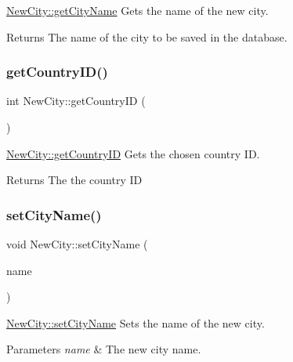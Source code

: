 \hyperlink{class_new_city_a3be62538974fa100134d694546608877}{New\+City\+::get\+City\+Name} Gets the name of the new city. 

\begin{DoxyReturn}{Returns}
The name of the city to be saved in the database. 
\end{DoxyReturn}
\mbox{\label{class_new_city_a743baefdc6604f1bf8da124056939b0c}} 
\subsubsection{\texorpdfstring{get\+Country\+I\+D()}{getCountryID()}}
{\footnotesize\ttfamily int New\+City\+::get\+Country\+ID (\begin{DoxyParamCaption}{ }\end{DoxyParamCaption})}



\hyperlink{class_new_city_a743baefdc6604f1bf8da124056939b0c}{New\+City\+::get\+Country\+ID} Gets the chosen country ID. 

\begin{DoxyReturn}{Returns}
The the country ID 
\end{DoxyReturn}
\mbox{\label{class_new_city_afe093fcb1aa6623e896c52ea35ff0481}} 
\subsubsection{\texorpdfstring{set\+City\+Name()}{setCityName()}}
{\footnotesize\ttfamily void New\+City\+::set\+City\+Name (\begin{DoxyParamCaption}\item[{Q\+String}]{name }\end{DoxyParamCaption})}



\hyperlink{class_new_city_afe093fcb1aa6623e896c52ea35ff0481}{New\+City\+::set\+City\+Name} Sets the name of the new city. 


\begin{DoxyParams}{Parameters}
{\em name} & The new city name. \\
\hline
\end{DoxyParams}
\mbox{\label{class_new_city_a8a96f2c58640c96faf74e1f3bb956e4e}} 
